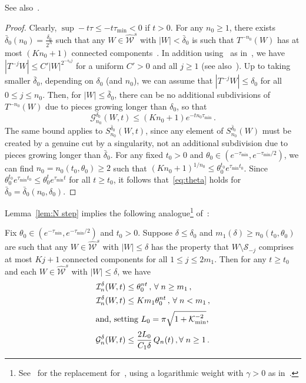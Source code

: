 \documentclass[AHL,Unicode,longabstracts,published]{cedram}
\newcommand{\cG}{\mathcal{G}}
\newcommand{\cI}{\mathcal{I}}
\newcommand{\cK}{\mathcal{K}}
\newcommand{\cS}{\mathcal{S}}
\newcommand{\cW}{\mathcal{W}}
\newcommand{\hW}{\widehat{\cW}}
\newcommand*{\MK}{\mkern 2mu}
\let\oldforall\forall
\renewcommand*{\forall}{\mathrel{\oldforall}}
\begin{document}
See also~\cite[Lemma~3.1$\MK$(a)]{Ca}.

\begin{proof}
Clearly,
$\sup -t\tau \le -t \tau_{\min}<0$ if $t>0$. For any $n_0\ge 1$, there exists $\bar \delta_0(n_0)=\frac{\delta_0}{2^N}$ such that any $W\in \hW^s$ with $|W|<\bar \delta_0$ is such that $T^{-n_0}(W)$ has at most $(Kn_0+1)$ connected components~\cite[Lemma~5.2]{Ch}. In addition using~\cite[Ex.~4.50]{CM} as in~\cite[Proof of Lemma~5.1]{BD1}, we have $|T^{-j}W|\le C' |W|^{2^{-s_0 j}}$ for a uniform $C'>0$ and all $j\ge 1$ (see also~\cite[Lemma~3.1]{Ca}). Up to taking smaller $\bar \delta_0$, depending on $\delta_0$ (and $n_0$), we can assume that $|T^{-j}W|\le \delta_0$ for all $0\le j\le n_0$. Then, for $|W|\le \bar \delta_0$, there can be no additional subdivisions of $T^{-n_0}(W)$ due to pieces growing longer than $\delta_0$, so that
\begin{equation}\label{complexity step}
\cG_{n_0}^{ \delta_0}(W,t)
\le (K n_0+1) e^{-tn_0 \tau_{\min}} \,.
\end{equation}
The same bound applies to $S_{n_0}^{\bar \delta_0}(W,t)$, since any element of $S_{n_0}^{\bar \delta_0}(W)$ must be created by a genuine cut by a singularity, not an additional subdivision due to pieces growing longer than $\bar \delta_0$. For any fixed $t_0>0$ and $\theta_0\in (e^{- \tau_{\min}},e^{- \tau_{\min}/2})$, we can find $n_0=n_0(t_0, \theta_0)\ge 2$ such that $(Kn_0+1)^{1/n_0} \le \theta_0^{t_0} e^{\tau_{\min} t_0}$. Since $ \theta_0^{t_0} e^{\tau_{\min} t_0}\le \theta_0^{t} e^{\tau_{\min} t}$ for all $t\ge t_0$, it follows that~\eqref{eq:theta} holds for $\bar \delta_0=\bar \delta_0(n_0,\delta_0)$.
\end{proof}

Lemma~\ref{lem:N step} implies the following analogue\footnote{See~\cite[Lemma~3.1$\MK$(b)]{Ca} for the replacement for~\cite[Lemmas~3.3--3.4, $\zeta\ne 0$]{BD2}, using a logarithmic weight with $\gamma>0$ as in~\cite{BD1}.} of~\cite[Lemmas~3.3--3.4, $\zeta=0$]{BD2}:

\begin{lemm}\label{lem:short growth}
Fix $\theta_0\in (e^{- \tau_{\min}}, e^{-\tau_{\min}/2})$ and $t_0 > 0$. Suppose $\delta \le \delta_0$ and $m_1(\delta) \ge n_0(t_0, \theta_0)$ are such that any $W \in \hW^s$ with $|W| \le \delta$ has the property that $W \setminus \cS_{-j}$ comprises at most $Kj + 1$ connected components for all $1 \le j \le 2m_1$. Then for any $t \ge t_0$ and each $W \in \hW^s$ with $|W| \le \delta$, we have
\begin{align}
\cI^{\delta}_n(W,t)
&\le \theta_0^{nt} \,, \, \forall n\ge m_1\,,
\label{eq:short growth up}
\\
\cI^{\delta}_n(W,t)
&\le Km_1 \theta_0^{nt} \,, \, \forall n < m_1\,,\label{eq:short growth up small n}
\\
\intertext{and, setting $L_0 = \pi \sqrt{1 + \cK_{\min}^{-2}}$,}
\cG^{\delta}_n(W,t) &\le \frac{2 L_0 }{C_1 \delta}\, Q_n(t) \,, \forall n\ge 1 \,.\label{eq:extra growth up}
\end{align}
\end{lemm}
\end{document}
